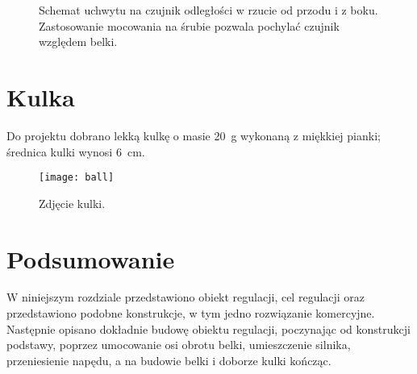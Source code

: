 \begin{figure}[H]
    \centering
    
    \caption{Schemat uchwytu na czujnik odległości w rzucie od przodu i z boku. Zastosowanie mocowania na śrubie pozwala pochylać czujnik względem belki.}
    \label{fig:uchwyt_czujnika_odleglosci}
\end{figure}

\section{Kulka}
\label{sec:ch2_kulka}

Do projektu dobrano lekką kulkę o masie \SI{20}{g} wykonaną z miękkiej pianki; średnica kulki wynosi \SI{6}{cm}.

\begin{figure}[H]
    \centering
    \texttt{[image: ball]}
    \caption{Zdjęcie kulki.}
    \label{fig:kulka}
\end{figure}

\section{Podsumowanie}

W niniejszym rozdziale przedstawiono obiekt regulacji, cel regulacji oraz przedstawiono podobne konstrukcje, w tym jedno rozwiązanie komercyjne. Następnie opisano dokładnie budowę obiektu regulacji, poczynając od konstrukcji podstawy, poprzez umocowanie osi obrotu belki, umieszczenie silnika, przeniesienie napędu, a na budowie belki i doborze kulki kończąc.

